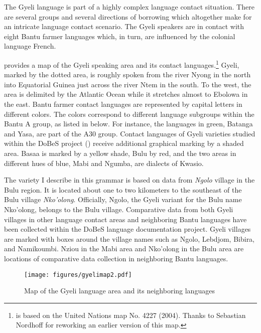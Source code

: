 The Gyeli language is part of a highly complex language contact situation. There are several groups and several directions of borrowing  which altogether make for an intricate language contact scenario. The Gyeli speakers are in contact with eight Bantu farmer languages which, in turn, are influenced by the colonial language French. 

 provides a map of the Gyeli speaking area and its contact languages.\footnote{ is based on the United Nations map No. 4227 (2004). Thanks to Sebastian Nordhoff for reworking an earlier version of this map.} Gyeli, marked by the dotted area, is roughly spoken from the river Nyong in the north into Equatorial Guinea just across the river Ntem in the south. To the west, the area is delimited by the Atlantic Ocean while it stretches almost to Ebolowa in the east. Bantu farmer contact languages are represented by capital letters in different colors. The colors correspond to different language subgroups within the Bantu A group, as listed in  below. For instance, the languages in green, Batanga and Yasa, are part of the A30 group. Contact languages of Gyeli varieties studied within the DoBeS project () receive additional graphical marking by a shaded area.  Basaa is marked by a yellow shade, Bulu by red, and the two areas in different hues of blue, Mabi and Ngumba, are dialects of Kwasio.

The variety I describe in this grammar is based on data from {\itshape Ngolo} village in the Bulu region. It is located about one to two kilometers to the southeast of the Bulu village {\itshape Nko'olong}. Officially, Ngolo, the Gyeli variant for the Bulu name Nko'olong, belongs to the Bulu village.  Comparative data from both Gyeli villages in other language contact areas and neighboring Bantu languages have been collected within the DoBeS language documentation project. Gyeli villages are marked with boxes around the village names such as Ngolo, Lebdjom, Bibira, and Namikoumbi. Nziou in the Mabi area and Nko'olong in the Bulu area are locations of comparative data collection in neighboring Bantu languages.

\begin{figure}
\texttt{[image: figures/gyelimap2.pdf]}
\caption{Map of the Gyeli language area and its neighboring languages}
\label{Fig:Gyeli-map}
\end{figure}

